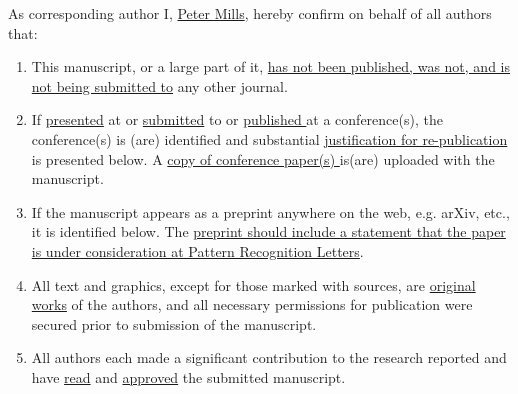 \documentclass[twocolumn,final,authoryear]{elsarticle}
\begin{document}
\thispagestyle{empty}
                                                             
\begin{table*}[!th]

\begin{minipage}{.9\textwidth}
\baselineskip12pt
\ifpreprint
  \vspace*{1pc}
\else
  \vspace*{-6pc}
\fi

\vskip6pt


\vskip1pc


\vskip1pc

As corresponding author 
I, 
	\underline{Peter Mills}, 
hereby confirm on behalf of all authors that:

\vskip1pc

\begin{enumerate}
\itemsep=3pt
\item This manuscript, or a large part of it, \underline {has not been
published,  was not, and is not being submitted to} any other journal. 

\item If \underline {presented} at or \underline {submitted} to or
\underline  {published }at a conference(s), the conference(s) is (are)
identified and  substantial \underline {justification for
re-publication} is presented  below. A \underline {copy of
conference paper(s) }is(are) uploaded with the  manuscript.

\item If the manuscript appears as a preprint anywhere on the web, e.g.
arXiv,  etc., it is identified below. The \underline {preprint should
include a  statement that the paper is under consideration at Pattern
Recognition  Letters}.

\item All text and graphics, except for those marked with sources, are
\underline  {original works} of the authors, and all necessary
permissions for  publication were secured prior to submission of the
manuscript.

\item All authors each made a significant contribution to the research
reported  and have \underline {read} and \underline {approved} the
submitted  manuscript. 
\end{enumerate}


\end{minipage}
\end{table*}
\end{document}
